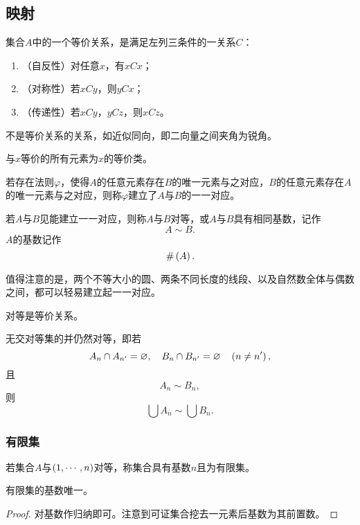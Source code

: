 \documentclass{ctexrep}
\begin{document}
  \subsection{映射}
  \begin{definition}
    集合$A$中的一个等价关系，是满足左列三条件的一关系$C$：
    \begin{enumerate}
      \item （自反性）对任意$x$，有$xCx$；
      \item （对称性）若$xCy$，则$yCx$；
      \item （传递性）若$xCy$，$yCz$，则$xCz$。
    \end{enumerate}
  \end{definition}
  不是等价关系的关系，如近似同向，即二向量之间夹角为锐角。
  \begin{definition}
    与$x$等价的所有元素为$x$的等价类。
  \end{definition}
  \begin{definition}
    若存在法则$\varphi$，使得$A$的任意元素存在$B$的唯一元素与之对应，$B$的任意元素存在$A$的唯一元素与之对应，则称$\varphi$建立了$A$与$B$的一一对应。
  \end{definition}
  \begin{definition}
    若$A$与$B$见能建立一一对应，则称$A$与$B$对等，或$A$与$B$具有相同基数，记作
    \[ A \sim B. \]
    $A$的基数记作
    \[ \#\left(A\right). \]
  \end{definition}
  \par
  值得注意的是，两个不等大小的圆、两条不同长度的线段、以及自然数全体与偶数之间，都可以轻易建立起一一对应。
  \begin{theorem}
    对等是等价关系。
  \end{theorem}
  \begin{theorem}
    无交对等集的并仍然对等，即若
    \[ A_n \cap A_{n'} = \varnothing,\quad B_n \cap B_{n'} = \varnothing \quad \left(n \ne n'\right), \]
    且
    \[ A_n \sim B_n, \]
    则
    \[ \bigcup A_n \sim \bigcup B_n. \]
  \end{theorem}
  \subsubsection{有限集}
  \begin{definition}
    若集合$A$与$\left(1,\cdots,n\right)$对等，称集合具有基数$n$且为有限集。
  \end{definition}
  \begin{proposition}
    有限集的基数唯一。
  \end{proposition}
  \begin{proof}
    对基数作归纳即可。注意到可证集合挖去一元素后基数为其前置数。
  \end{proof}
\end{document}
